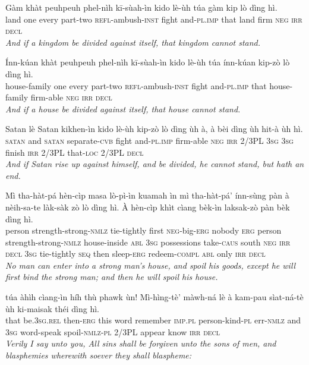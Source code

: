 \documentclass[11pt,a4paper]{article}
\begin{document}
\begin{exe}
\gll Gàm khàt peuhpeuh phel-nìh kī-sùah-ìn kido lè-ùh túa gàm kip lò dìng hì. \\
     land one every part-two \textsc{refl}-ambush-\textsc{inst} fight and-\textsc{pl}.\textsc{imp} that land firm \textsc{neg} \textsc{irr} \textsc{decl} \\
\glt \textcolor{kjvcolor}{\textit{And if a kingdom be divided against itself, that kingdom cannot stand.}}

\gll Ínn-kúan khàt peuhpeuh phel-nìh kī-sùah-ìn kido lè-ùh túa ínn-kúan kip-zò lò dìng hì. \\
     house-family one every part-two \textsc{refl}-ambush-\textsc{inst} fight and-\textsc{pl}.\textsc{imp} that house-family firm-able \textsc{neg} \textsc{irr} \textsc{decl} \\
\glt \textcolor{kjvcolor}{\textit{And if a house be divided against itself, that house cannot stand.}}

\gll Satan lè Satan kikhen-ìn kido lè-ùh kip-zò lò dìng ùh à, à bèi dìng ùh hit-à ùh hì. \\
     \textsc{satan} and \textsc{satan} separate-\textsc{cvb} fight and-\textsc{pl}.\textsc{imp} firm-able \textsc{neg} \textsc{irr} 2/3PL \textsc{3sg} \textsc{3sg} finish \textsc{irr} 2/3PL that-\textsc{loc} 2/3PL \textsc{decl} \\
\glt \textcolor{kjvcolor}{\textit{And if Satan rise up against himself, and be divided, he cannot stand, but hath an end.}}

\gll Mì tha-hàt-pá hèn-cìp masa lò-pì-ìn kuamah ìn mì tha-hàt-pá' ínn-sùng pàn à nèih-sa-te làk-sàk zò lò dìng hì. À hèn-cìp khìt cìang bèk-ìn laksak-zò pàn bèk dìng hì. \\
     person strength-strong-\textsc{nmlz} tie-tightly first \textsc{neg}-big-\textsc{erg} nobody \textsc{erg} person strength-strong-\textsc{nmlz} house-inside \textsc{abl} \textsc{3sg} possessions take-\textsc{caus} south \textsc{neg} \textsc{irr} \textsc{decl} \textsc{3sg} tie-tightly \textsc{seq} then sleep-\textsc{erg} redeem-\textsc{compl} \textsc{abl} only \textsc{irr} \textsc{decl} \\
\glt \textcolor{kjvcolor}{\textit{No man can enter into a strong man's house, and spoil his goods, except he will first bind the strong man; and then he will spoil his house.}}

\gll túa àhìh cìang-ìn híh thù phawk ùn! Mì-hìng-tè' màwh-ná lè à kam-pau sìat-ná-tè ùh ki-maisak théi dìng hì. \\
     that be.\textsc{3sg}.\textsc{rel} then-\textsc{erg} this word remember \textsc{imp}.\textsc{pl} person-kind-\textsc{pl} err-\textsc{nmlz} and \textsc{3sg} word-speak spoil-\textsc{nmlz}-\textsc{pl} 2/3PL appear know \textsc{irr} \textsc{decl} \\
\glt \textcolor{kjvcolor}{\textit{Verily I say unto you, All sins shall be forgiven unto the sons of men, and blasphemies wherewith soever they shall blaspheme:}}


\end{exe}
\end{document}
